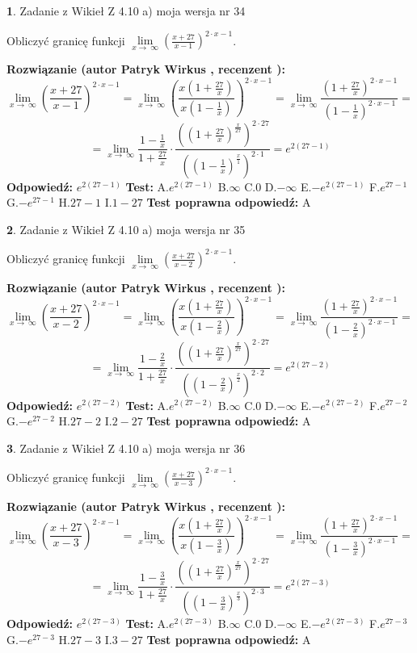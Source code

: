 \documentclass[12pt, a4paper]{article}
\theoremstyle{definition} %
\newtheorem{zad}{}
\newcommand{\zadStart}[1]{\begin{zad}#1\newline}
\newcommand{\zadStop}{\end{zad}}
\newcommand{\rozwStart}[2]{\noindent \textbf{Rozwiązanie (autor #1 , recenzent #2): }\newline}
\newcommand{\rozwStop}{\newline}
\newcommand{\odpStart}{\noindent \textbf{Odpowiedź:}\newline}
\newcommand{\odpStop}{\newline}
\newcommand{\testStart}{\noindent \textbf{Test:}\newline}
\newcommand{\testStop}{\newline}
\newcommand{\kluczStart}{\noindent \textbf{Test poprawna odpowiedź:}\newline}
\newcommand{\kluczStop}{\newline}
\begin{document}
\zadStart{Zadanie z Wikieł Z 4.10 a) moja wersja nr 34}


Obliczyć granicę funkcji  $\lim\limits_{x\to\ \infty}(\frac{x+27}{x-1})^{2\cdot x-1}$.
\zadStop
\rozwStart{Patryk Wirkus}{}
$$\lim\limits_{x\to\ \infty}(\frac{x+27}{x-1})^{2\cdot x-1} = \lim\limits_{x\to\ \infty}(\frac{x(1+\frac{27}{x})}{x(1-\frac{1}{x})})^{2\cdot x-1}=\lim\limits_{x\to\ \infty}\frac{(1+\frac{27}{x})^{2\cdot x-1}}{(1-\frac{1}{x})^{2\cdot x-1}}=$$
$$=\lim\limits_{x\to\ \infty}\frac{1-\frac{1}{x}}{1+\frac{27}{x}}\cdot\frac{((1+\frac{27}{x})^{\frac{x}{27}})^{2\cdot27}}{((1-\frac{1}{x})^{\frac{x}{1}})^{2\cdot1}}=e^{2(27-1)}$$
\rozwStop
\odpStart
$e^{2(27-1)}$
\odpStop
\testStart
A.$e^{2(27-1)}$ B.$\infty$ C.$0$ D.$-\infty$ E.$-e^{2(27-1)}$
F.$e^{27-1}$ G.$-e^{27-1}$
H.$27-1$
I.$1-27$
\testStop
\kluczStart
A
\kluczStop



\zadStart{Zadanie z Wikieł Z 4.10 a) moja wersja nr 35}


Obliczyć granicę funkcji  $\lim\limits_{x\to\ \infty}(\frac{x+27}{x-2})^{2\cdot x-1}$.
\zadStop
\rozwStart{Patryk Wirkus}{}
$$\lim\limits_{x\to\ \infty}(\frac{x+27}{x-2})^{2\cdot x-1} = \lim\limits_{x\to\ \infty}(\frac{x(1+\frac{27}{x})}{x(1-\frac{2}{x})})^{2\cdot x-1}=\lim\limits_{x\to\ \infty}\frac{(1+\frac{27}{x})^{2\cdot x-1}}{(1-\frac{2}{x})^{2\cdot x-1}}=$$
$$=\lim\limits_{x\to\ \infty}\frac{1-\frac{2}{x}}{1+\frac{27}{x}}\cdot\frac{((1+\frac{27}{x})^{\frac{x}{27}})^{2\cdot27}}{((1-\frac{2}{x})^{\frac{x}{2}})^{2\cdot2}}=e^{2(27-2)}$$
\rozwStop
\odpStart
$e^{2(27-2)}$
\odpStop
\testStart
A.$e^{2(27-2)}$ B.$\infty$ C.$0$ D.$-\infty$ E.$-e^{2(27-2)}$
F.$e^{27-2}$ G.$-e^{27-2}$
H.$27-2$
I.$2-27$
\testStop
\kluczStart
A
\kluczStop



\zadStart{Zadanie z Wikieł Z 4.10 a) moja wersja nr 36}


Obliczyć granicę funkcji  $\lim\limits_{x\to\ \infty}(\frac{x+27}{x-3})^{2\cdot x-1}$.
\zadStop
\rozwStart{Patryk Wirkus}{}
$$\lim\limits_{x\to\ \infty}(\frac{x+27}{x-3})^{2\cdot x-1} = \lim\limits_{x\to\ \infty}(\frac{x(1+\frac{27}{x})}{x(1-\frac{3}{x})})^{2\cdot x-1}=\lim\limits_{x\to\ \infty}\frac{(1+\frac{27}{x})^{2\cdot x-1}}{(1-\frac{3}{x})^{2\cdot x-1}}=$$
$$=\lim\limits_{x\to\ \infty}\frac{1-\frac{3}{x}}{1+\frac{27}{x}}\cdot\frac{((1+\frac{27}{x})^{\frac{x}{27}})^{2\cdot27}}{((1-\frac{3}{x})^{\frac{x}{3}})^{2\cdot3}}=e^{2(27-3)}$$
\rozwStop
\odpStart
$e^{2(27-3)}$
\odpStop
\testStart
A.$e^{2(27-3)}$ B.$\infty$ C.$0$ D.$-\infty$ E.$-e^{2(27-3)}$
F.$e^{27-3}$ G.$-e^{27-3}$
H.$27-3$
I.$3-27$
\testStop
\kluczStart
A
\kluczStop
\end{document}
